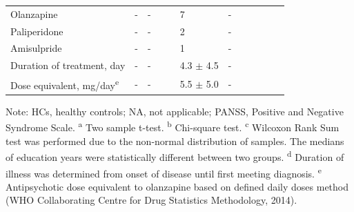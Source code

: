 \begin{refsection}
\begin{table}
\begin{tabular}{@{}llllclllclll@{}}
Olanzapine & - & - & && 7 & - & \\
Paliperidone & - & - & && 2 & - & \\
Amisulpride & - & - & && 1 & - & \\
Duration of treatment, day & - & - & && 4.3 $\pm$ 4.5 & - & \\
Dose equivalent, mg/day\textsuperscript{e} & - & - & && 5.5 $\pm$ 5.0 & - & \\
\bottomrule
\end{tabular}
\begin{flushleft}
\footnotesize
Note: HCs, healthy controls; NA, not applicable; PANSS, Positive and Negative Syndrome Scale. \textsuperscript{a} Two sample t-test. \textsuperscript{b} Chi-square test. \textsuperscript{c} Wilcoxon Rank Sum test was performed due to the non-normal distribution of samples. The medians of education years were statistically different between two groups. \textsuperscript{d} Duration of illness was determined from onset of disease until first meeting diagnosis. \textsuperscript{e} Antipsychotic dose equivalent to olanzapine based on defined daily doses method (WHO Collaborating Centre for Drug Statistics Methodology, 2014).
\end{flushleft}
\label{table1:demongraphics}
\end{table}


\end{refsection}
